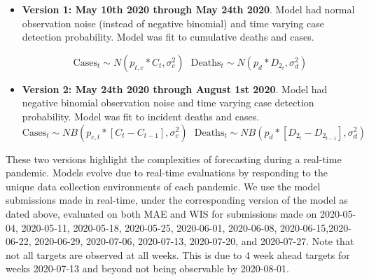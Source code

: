 \documentclass[11pt]{amsart}
\begin{document}
 \begin{itemize}
 
% 

  \item \textbf{Version 1: May 10th 2020 through May 24th 2020}. Model had normal observation noise (instead of negative binomial) and time varying case detection probability. Model was fit to cumulative deaths and cases. 
  
   \begin{equation}
\text{Cases}_{t} \sim N(p_{t,c}*C_{t} ,\sigma_{c}^2) \ \ \  
\text{Deaths}_{t} \sim N(p_d*D_{2_{t}} , \sigma_d^2)
\end{equation}


    \item \textbf{Version 2: May 24th 2020 through August 1st 2020}. Model had negative binomial observation noise  and time varying case detection probability. Model was fit to incident deaths and cases. 
     \begin{equation}
\text{Cases}_{t} \sim NB(p_{c,t}*[C_{t}-C_{t-1}] ,\sigma_{c}^2) \ \ \  
\text{Deaths}_{t} \sim NB(p_d*[D_{2_{t}} - D_{2_{t-1}}] , \sigma_d^2)
\end{equation}
    
 \end{itemize} 
 
 
 These two versions highlight the complexities of forecasting during a real-time pandemic. Models evolve due to real-time evaluations by responding to the unique data collection environments of each pandemic. We use the model submissions made in real-time, under the corresponding version of the model as dated above, evaluated on both MAE and WIS for submissions made on 2020-05-04, 2020-05-11, 2020-05-18, 2020-05-25, 2020-06-01, 2020-06-08, 2020-06-15,2020-06-22, 2020-06-29, 2020-07-06, 2020-07-13, 2020-07-20, and 2020-07-27. Note that not all targets are observed at all weeks. This is due to 4 week ahead targets for weeks 2020-07-13 and beyond not being observable by 2020-08-01.
 
\end{document}
